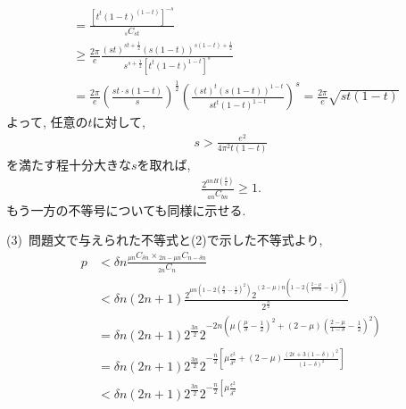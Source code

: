 \begin{ex}
\begin{align*}
         & =
        \frac{\left[ t^{t} (1-t)^{(1-t)}\right]^{-s}}{{}_s C_{st}}
        \\
         & \ge
        \frac{2 \pi}{e}
        \frac{(st)^{st + \frac{1}{2}} (s(1-t))^{s(1-t)+ \frac{1}{2}}}{s^{s + \frac{1}{2}} \left[ t^{t} (1-t)^{1-t}\right]^s}
        \\
         & =
        \frac{2 \pi}{e}
        \left(
        \frac{st \cdot s(1-t)}{s}
        \right)^{\frac{1}{2}}
        \left(
        \frac{(st)^t (s(1-t))^{1-t}}{s t^t (1-t)^{1-t}}
        \right)^{s}
        =
        \frac{2 \pi}{e}
        \sqrt{st(1-t)}
    \end{align*}
    よって, 任意の$t$に対して,
    \begin{align*}
        s > \frac{e^2}{4 \pi^2 t(1-t)}
    \end{align*}
    を満たす程十分大きな$s$を取れば,
    \begin{align*}
        \frac{2^{an H \left( \frac{b}{a}\right)}}{{}_{an} C_{bn}} \ge 1.
    \end{align*}
    もう一方の不等号についても同様に示せる.
    \par
    (3)\
    問題文で与えられた不等式と(2)で示した不等式より,
    \begin{align*}
        p
         & <
        \delta n
        \frac{{}_{\mu n} C _{\delta n} \times {}_{2n - \mu n} C _{n - \delta n}}{{}_{2n} C_n}
        \\
         & <
        \delta n (2n+1) \frac{
            2^{\mu n \left( 1 - 2 \left(  \frac{\mu}{\delta} - \frac{1}{2}\right)^2\right)}
            2^{(2 - \mu )n \left( 1 - 2 \left(  \frac{2 - \mu}{ 1 - \delta} - \frac{1}{2}\right)^2\right)}
        }
        {
            2^{\frac{n}{2}}
        }
        \\
         & =
        \delta n (2n+1) 2^{\frac{3n}{2}}
        2^{-2 n \left( \mu \left(\frac{\mu}{\delta} - \frac{1}{2}\right)^2
                + (2 - \mu) \left(\frac{2 - \mu}{ 1 - \delta} - \frac{1}{2}\right)^2 \right)}
        \\
         & =
        \delta n (2n+1) 2^{\frac{3n}{2}}
        2^{
                -\frac{n}{2}
                \left[
                    \mu \frac{\epsilon^2}{\delta^2}
                    +  (2 - \mu)\frac{(2\epsilon + 3 (1 - \delta))^2}{ (1 - \delta)^2}
                    \right]
            }
        \\
         & <
        \delta n (2n+1) 2^{\frac{3n}{2}}
        2^{
                -\frac{n}{2}
                \left[
                    \mu \frac{\epsilon^2}{\delta^2}
}
\end{align*}
\end{ex}
